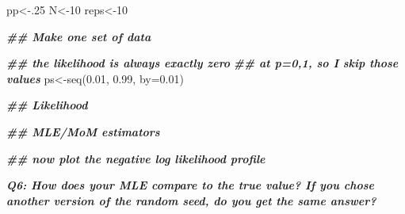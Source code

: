 \documentclass[
]{article}
\newenvironment{Shaded}{\begin{snugshade}}{\end{snugshade}}
\newcommand{\AttributeTok}[1]{\textcolor[rgb]{0.77,0.63,0.00}{#1}}
\newcommand{\DecValTok}[1]{\textcolor[rgb]{0.00,0.00,0.81}{#1}}
\newcommand{\DocumentationTok}[1]{\textcolor[rgb]{0.56,0.35,0.01}{\textbf{\textit{#1}}}}
\newcommand{\FloatTok}[1]{\textcolor[rgb]{0.00,0.00,0.81}{#1}}
\newcommand{\FunctionTok}[1]{\textcolor[rgb]{0.00,0.00,0.00}{#1}}
\newcommand{\NormalTok}[1]{#1}
\newcommand{\OtherTok}[1]{\textcolor[rgb]{0.56,0.35,0.01}{#1}}
\begin{document}
\begin{Shaded}
\begin{Highlighting}[]
\NormalTok{pp}\OtherTok{\textless{}{-}}\NormalTok{.}\DecValTok{25}
\NormalTok{N}\OtherTok{\textless{}{-}}\DecValTok{10}
\NormalTok{reps}\OtherTok{\textless{}{-}}\DecValTok{10}

\DocumentationTok{\#\# Make one set of data}

\DocumentationTok{\#\# the likelihood is always exactly zero}
\DocumentationTok{\#\# at p=0,1, so I skip those values}
\NormalTok{ps}\OtherTok{\textless{}{-}}\FunctionTok{seq}\NormalTok{(}\FloatTok{0.01}\NormalTok{, }\FloatTok{0.99}\NormalTok{, }\AttributeTok{by=}\FloatTok{0.01}\NormalTok{) }

\DocumentationTok{\#\# Likelihood}


\DocumentationTok{\#\# MLE/MoM estimators }

\DocumentationTok{\#\# now plot the negative log likelihood profile}
\end{Highlighting}
\end{Shaded}

\textbf{\emph{Q6: How does your MLE compare to the true value? If you
chose another version of the random seed, do you get the same answer?}}
\end{document}
